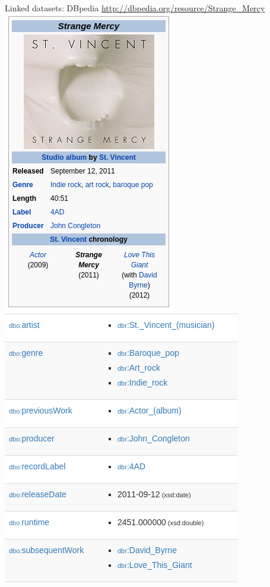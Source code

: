 \documentclass{beamer}
\begin{document}
\begin{frame}{Linked datasets: DBpedia}
\url{http://dbpedia.org/resource/Strange_Mercy}
\includegraphics[width=.32\textwidth]{strange_mercy1.png}
\includegraphics[width=.5\textwidth]{dbpedia1.png}
\end{frame}
\end{document}
